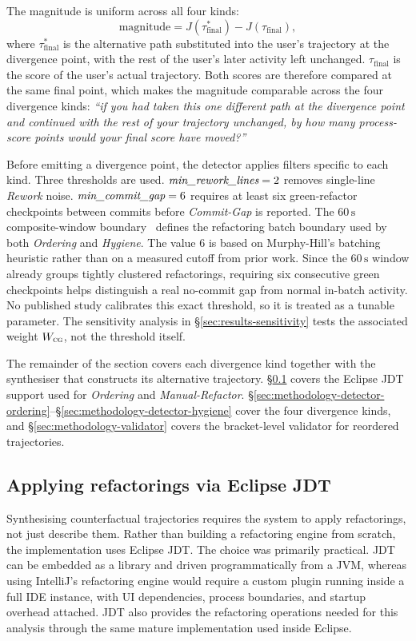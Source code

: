 The magnitude is uniform across all four kinds:
\[
\mathrm{magnitude} = J(\tau^{\ast}_{\mathrm{final}}) - J(\tau_{\mathrm{final}}),
\]
where $\tau^{\ast}_{\mathrm{final}}$ is the alternative path substituted into the user's trajectory at the divergence point, with the rest of the user's later activity left unchanged. $\tau_{\mathrm{final}}$ is the score of the user's actual trajectory. Both scores are therefore compared at the same final point, which makes the magnitude comparable across the four divergence kinds: \emph{``if you had taken this one different path at the divergence point and continued with the rest of your trajectory unchanged, by how many process-score points would your final score have moved?''}

Before emitting a divergence point, the detector applies filters specific to each kind. Three thresholds are used. $\emph{min\_rework\_lines} = 2$ removes single-line \emph{Rework} noise. $\emph{min\_commit\_gap} = 6$ requires at least six green-refactor checkpoints between commits before \emph{Commit-Gap} is reported. The $60\,\mathrm{s}$ composite-window boundary~\cite{murphyhill2009howrefactor} defines the refactoring batch boundary used by both \emph{Ordering} and \emph{Hygiene}. The value $6$ is based on Murphy-Hill's batching heuristic rather than on a measured cutoff from prior work. Since the $60\,\mathrm{s}$ window already groups tightly clustered refactorings, requiring six consecutive green checkpoints helps distinguish a real no-commit gap from normal in-batch activity. No published study calibrates this exact threshold, so it is treated as a tunable parameter. The sensitivity analysis in \S\ref{sec:results-sensitivity} tests the associated weight $W_{\textsc{cg}}$, not the threshold itself.

The remainder of the section covers each divergence kind together with the synthesiser that constructs its alternative trajectory. \S\ref{sec:arch-jdt} covers the Eclipse JDT support used for \emph{Ordering} and \emph{Manual-Refactor}. \S\ref{sec:methodology-detector-ordering}--\S\ref{sec:methodology-detector-hygiene} cover the four divergence kinds, and \S\ref{sec:methodology-validator} covers the bracket-level validator for reordered trajectories.

\subsection{Applying refactorings via Eclipse JDT}
\label{sec:arch-jdt}

Synthesising counterfactual trajectories requires the system to apply refactorings, not just describe them. Rather than building a refactoring engine from scratch, the implementation uses Eclipse JDT. The choice was primarily practical. JDT can be embedded as a library and driven programmatically from a JVM, whereas using IntelliJ's refactoring engine would require a custom plugin running inside a full IDE instance, with UI dependencies, process boundaries, and startup overhead attached. JDT also provides the refactoring operations needed for this analysis through the same mature implementation used inside Eclipse.

